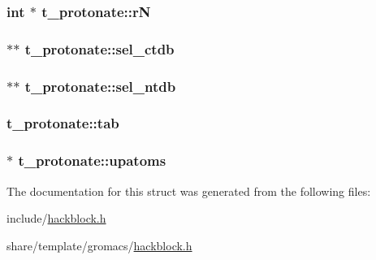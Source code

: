 \hypertarget{structt__protonate_a9aed18a32037e2cfae82a61fa99a0977}{
\subsubsection[{r\-N}]{\setlength{\rightskip}{0pt plus 5cm}int $\ast$ {\bf t\-\_\-protonate\-::r\-N}}}\label{structt__protonate_a9aed18a32037e2cfae82a61fa99a0977}
\hypertarget{structt__protonate_a54953c6e30be706882685c61673a0171}{
\subsubsection[{sel\-\_\-ctdb}]{ $\ast$$\ast$ {\bf t\-\_\-protonate\-::sel\-\_\-ctdb}}}\label{structt__protonate_a54953c6e30be706882685c61673a0171}
\hypertarget{structt__protonate_a1597a630a1caa00a4e78b0975ad0ecbb}{
\subsubsection[{sel\-\_\-ntdb}]{ $\ast$$\ast$ {\bf t\-\_\-protonate\-::sel\-\_\-ntdb}}}\label{structt__protonate_a1597a630a1caa00a4e78b0975ad0ecbb}
\hypertarget{structt__protonate_a0884a371331dfccef55c8fa4cade5627}{
\subsubsection[{tab}]{ {\bf t\-\_\-protonate\-::tab}}}\label{structt__protonate_a0884a371331dfccef55c8fa4cade5627}
\hypertarget{structt__protonate_add76a930db538f374e783c8de0d4958e}{
\subsubsection[{upatoms}]{ $\ast$ {\bf t\-\_\-protonate\-::upatoms}}}\label{structt__protonate_add76a930db538f374e783c8de0d4958e}


\-The documentation for this struct was generated from the following files\-:\begin{DoxyCompactItemize}
\item 
include/\hyperlink{include_2hackblock_8h}{hackblock.\-h}\item 
share/template/gromacs/\hyperlink{share_2template_2gromacs_2hackblock_8h}{hackblock.\-h}\end{DoxyCompactItemize}
